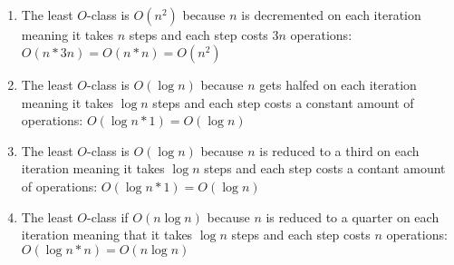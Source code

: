\documentclass[12pt]{article}
\begin{document}
\subsection{} %
\begin{enumerate}[a]
	\item %
	The least $O$-class is $O(n^2)$ because $n$ is decremented on each iteration meaning it takes $n$ steps and each step costs $3n$ operations: $O(n * 3n) = O(n * n) = O(n^2)$

	\item %
	The least $O$-class is $O(\log n)$ because $n$ gets halfed on each iteration meaning it takes $\log n$ steps and each step costs a constant amount of operations: $O(\log n * 1) = O(\log n)$

	\item %
	The least $O$-class is $O(\log n)$ because $n$ is reduced to a third on each iteration meaning it takes $\log n$ steps and each step costs a contant amount of operations: $O(\log n * 1) = O(\log n)$

	\item %
	The least $O$-class if $O(n \log n)$ because $n$ is reduced to a quarter on each iteration meaning that it takes $\log n$ steps and each step costs $n$ operations: $O(\log n * n) = O(n \log n)$
\end{enumerate}

\subsection{} %


\subsection{} %

\end{document}
